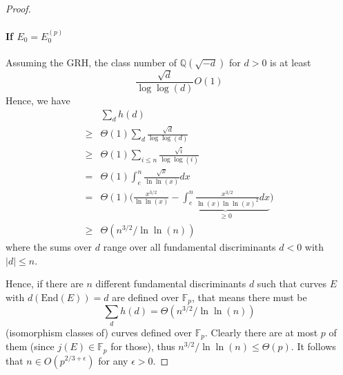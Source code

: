 \documentclass{scrartcl}
\newcommand{\F}{\mathbb{F}}
\newcommand{\End}{\mathrm{End}}
\theoremstyle{definition}
\begin{document}
\begin{proof}
    \paragraph*{If $E_0 = E_0^{(p)}$} Assuming the GRH, the class number of $\mathbb{Q}(\sqrt{-d})$ for $d > 0$ is at least
    \begin{equation*}
        \frac {\sqrt{d}} {\log\log(d)} O(1)
    \end{equation*}
    Hence, we have
    \begin{align*}
        &\sum_d h(d) \\
        \geq& \Theta(1) \sum_d \frac {\sqrt{d}} {\log\log(d)} \\
        \geq& \Theta(1) \sum_{i \leq n} \frac {\sqrt{i}} {\log\log(i)} \\
        =& \Theta(1) \int_e^n \frac {\sqrt{x}} {\ln\ln(x)} dx \\
        =& \Theta(1) \Biggl( \frac {x^{3/2}} {\ln\ln(x)} - \underbrace{\int_e^n \frac {x^{3/2}} {\ln(x)\ln\ln(x)^2} dx}_{\geq 0} \Biggr) \\
        \geq& \Theta(n^{3/2}/\ln\ln(n))
    \end{align*}
    where the sums over $d$ range over all fundamental discriminants $d < 0$ with $|d| \leq n$.

    Hence, if there are $n$ different fundamental discriminants $d$ such that curves $E$ with $d(\End(E)) = d$ are defined over $\F_p$, that means there must be
    \begin{equation*}
        \sum_d h(d) = \Theta(n^{3/2}/\ln\ln(n))
    \end{equation*}
    (isomorphism classes of) curves defined over $\F_p$.
    Clearly there are at most $p$ of them (since $j(E) \in \F_p$ for those), thus $n^{3/2}/\ln\ln(n) \leq \Theta(p)$.
    It follows that $n \in O(p^{2/3 + \epsilon})$ for any $\epsilon > 0$.
\end{proof}
\end{document}
